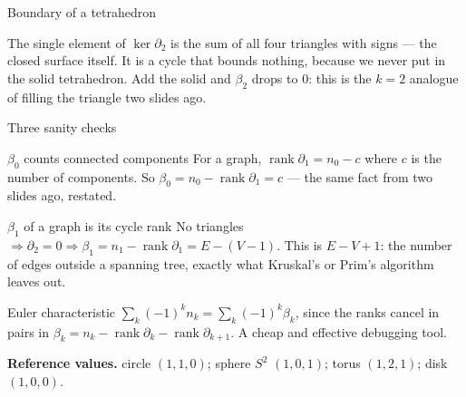 \documentclass[10pt,aspectratio=169]{beamer}
\newcommand{\rank}{\operatorname{rank}}
\begin{document}
\begin{frame}{Boundary of a tetrahedron}
        \vspace{0.5em}

        The single element of $\ker\partial_2$ is the sum of all four triangles with signs ---
        the closed surface itself. \alert{It is a cycle that bounds nothing, because we never
        put in the solid tetrahedron.} Add the solid and $\beta_2$ drops to $0$: this is the
        $k{=}2$ analogue of filling the triangle two slides ago.
    \end{frame}

    \begin{frame}[shrink=8]{Three sanity checks}
        \begin{block}{$\beta_0$ counts connected components}
            For a graph, $\rank\partial_1 = n_0-c$ where $c$ is the number of components. So
            $\beta_0=n_0-\rank\partial_1=c$ --- the same fact from two slides ago, restated. \checkmark
        \end{block}

        \begin{block}{$\beta_1$ of a graph is its cycle rank}
            No triangles $\Rightarrow \partial_2=0 \Rightarrow \beta_1=n_1-\rank\partial_1=E-(V-1)$.
            This is $E-V+1$: the number of edges outside a spanning tree, exactly what
            Kruskal's or Prim's algorithm leaves out.
        \end{block}

        \begin{block}{Euler characteristic}
            $\sum_k(-1)^kn_k=\sum_k(-1)^k\beta_k$, since the ranks cancel in pairs in
            $\beta_k=n_k-\rank\partial_k-\rank\partial_{k+1}$. A cheap and effective debugging tool.
        \end{block}

        \vspace{0.2em}

        \textbf{Reference values.} circle $(1,1,0)$; sphere $S^2$ $(1,0,1)$;
        torus $(1,2,1)$; disk $(1,0,0)$.
    \end{frame}
\end{document}
